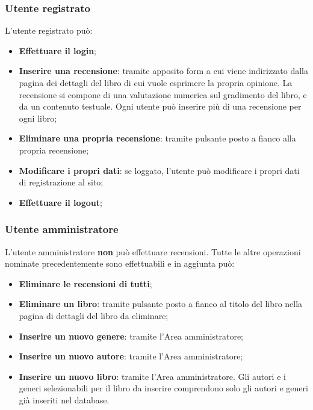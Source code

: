 \documentclass[12pt,a4paper,headings=optiontohead]{article}
\begin{document}
	\subsubsection{Utente registrato}
	
	L'utente registrato può:
	\begin{itemize}
		\item \textbf{Effettuare il login};
		\item \textbf{Inserire una recensione}: tramite apposito form a cui viene indirizzato dalla pagina dei dettagli del libro di cui vuole esprimere la propria opinione. La recensione si compone di una valutazione numerica sul gradimento del libro, e da un contenuto testuale. Ogni utente può inserire più di una recensione per ogni libro;
		\item \textbf{Eliminare una propria recensione}: tramite pulsante posto a fianco alla propria recensione;
		\item \textbf{Modificare i propri dati}: se loggato, l'utente può modificare i propri dati di registrazione al sito;
		\item \textbf{Effettuare il logout};
	\end{itemize}
	
	\subsubsection{Utente amministratore}
	
	L'utente amministratore \textbf{non} può effettuare recensioni. Tutte le altre operazioni nominate precedentemente sono effettuabili e in aggiunta può:
	\begin{itemize}
		\item \textbf{Eliminare le recensioni di tutti};
		\item \textbf{Eliminare un libro}: tramite pulsante posto a fianco al titolo del libro nella pagina di dettagli del libro da eliminare;
		\item \textbf{Inserire un nuovo genere}: tramite l'Area amministratore;
		\item \textbf{Inserire un nuovo autore}: tramite l'Area amministratore;
		\item \textbf{Inserire un nuovo libro}: tramite l'Area amministratore. Gli autori e i generi selezionabili per il libro da inserire comprendono solo gli autori e generi già inseriti nel database.
	\end{itemize}
	
	
	
	
	
\end{document}
